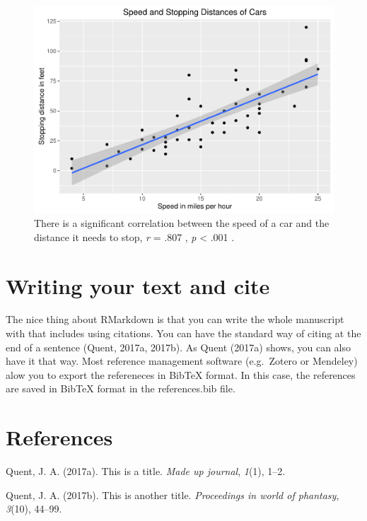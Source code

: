 \documentclass[12pt,]{article}
\begin{document}
\begin{figure}[htbp]
\centering
\includegraphics{methodsDay2017_example_files/figure-latex/unnamed-chunk-2-1.pdf}
\caption{There is a significant correlation between the speed of a car
and the distance it needs to stop, \emph{r} = .807 , \emph{p}
\textless{} .001 .}
\end{figure}

\section{Writing your text and cite}\label{writing-your-text-and-cite}

The nice thing about RMarkdown is that you can write the whole
manuscript with that includes using citations. You can have the standard
way of citing at the end of a sentence (Quent, 2017a, 2017b). As Quent
(2017a) shows, you can also have it that way. Most reference management
software (e.g.~Zotero or Mendeley) alow you to export the refereneces in
BibTeX format. In this case, the references are saved in BibTeX format
in the references.bib file.

\section*{References}\label{references}

\hypertarget{refs}{}
\hypertarget{ref-Quent2017a}{}
Quent, J. A. (2017a). This is a title. \emph{Made up journal},
\emph{1}(1), 1--2.

\hypertarget{ref-Quent2017b}{}
Quent, J. A. (2017b). This is another title. \emph{Proceedings in world
of phantasy}, \emph{3}(10), 44--99.
\end{document}

